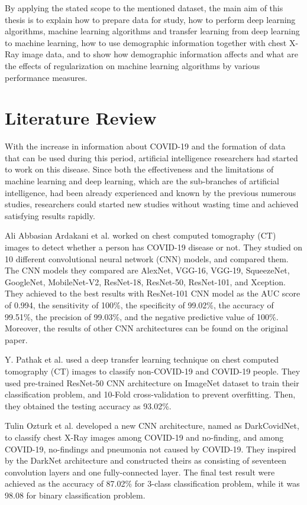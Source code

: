 By applying the stated scope to the mentioned dataset, the main aim of this thesis is to explain how to prepare data for study, how to perform deep learning algorithms, machine learning algorithms and transfer learning from deep learning to machine learning, how to use demographic information together with chest X-Ray image data, and to show how demographic information affects and what are the effects of regularization on machine learning algorithms by various performance measures.

\section{Literature Review}\label{literaturereview}

With the increase in information about COVID-19 and the formation of data that can be used during this period, artificial intelligence researchers had started to work on this disease. Since both the effectiveness and the limitations of machine learning and deep learning, which are the sub-branches of artificial intelligence, had been already experienced and known by the previous numerous studies, researchers could started new studies without wasting time and achieved satisfying results rapidly.

Ali Abbasian Ardakani et al. \cite{literature_ARDAKANI} worked on chest computed tomography (CT) images to detect whether a person has COVID-19 disease or not. They studied on 10 different convolutional neural network (CNN) models, and compared them. The CNN models they compared are AlexNet, VGG-16, VGG-19, SqueezeNet, GoogleNet, MobileNet-V2, ResNet-18, ResNet-50, ResNet-101, and Xception. They achieved to the best results with ResNet-101 CNN model as the AUC score of 0.994, the sensitivity of 100\%, the specificity of 99.02\%, the accuracy of 99.51\%, the precision of 99.03\%, and the negative predictive value of 100\%. Moreover, the results of other CNN architectures can be found on the original paper.

Y. Pathak et al. \cite{literature_Pathak} used a deep transfer learning technique on chest computed tomography (CT) images to classify non-COVID-19 and COVID-19 people. They used pre-trained ResNet-50 CNN architecture on ImageNet \cite{imagenet} dataset to train their classification problem, and 10-Fold cross-validation to prevent overfitting. Then, they obtained the testing accuracy as 93.02\%.

Tulin Ozturk et al. \cite{literature_OZTURK} developed a new CNN architecture, named as DarkCovidNet, to classify chest X-Ray images among COVID-19 and no-finding, and among COVID-19, no-findings and pneumonia not caused by COVID-19. They inspired by the DarkNet architecture \cite{yolo_darknet} and constructed theirs as consisting of seventeen convolution layers and one fully-connected layer. The final test result were achieved as the accuracy of 87.02\% for 3-class classification problem, while it was 98.08 for binary classification problem.

